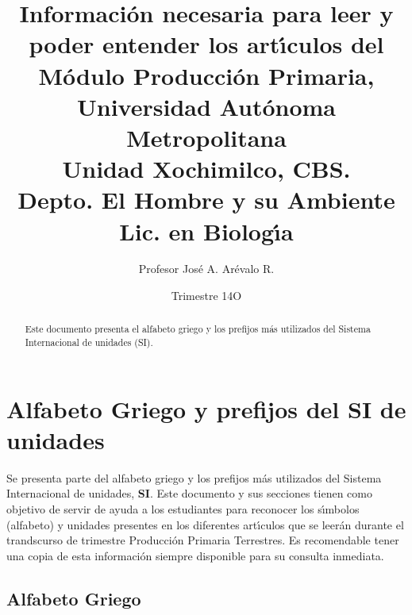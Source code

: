 \documentclass[letterpaper,spanish,12pt]{article}
\begin{document}
\title{Informaci\'{o}n necesaria para leer y poder entender los
  art\'{\i}culos del \\ 
M\'{o}dulo Producci\'{o}n Primaria, \\  
Universidad Aut\'{o}noma Metropolitana \\
Unidad Xochimilco, CBS. \\
Depto. El Hombre y su Ambiente \\
Lic. en Biolog\'{\i}a}

\author{Profesor Jos\'{e} A. Ar\'evalo R.}

\date{Trimestre 14O}

\maketitle

\begin{abstract}

Este documento presenta el alfabeto griego y los prefijos m\'{a}s
utilizados del Sistema Internacional de unidades (SI).
\end{abstract}


\section{Alfabeto Griego y prefijos del SI de unidades}

Se presenta parte del alfabeto griego y los prefijos m\'{a}s
utilizados del Sistema Internacional de unidades, \textbf{SI}. Este
documento y sus secciones tienen como objetivo de servir de ayuda a
los estudiantes para reconocer los s\'{\i}mbolos (alfabeto) y unidades
presentes en los diferentes art\'{\i}culos que se leer\'{a}n durante
el trandscurso de trimestre Producci\'{o}n Primaria Terrestres. Es
recomendable tener una copia de esta informaci\'{o}n siempre
disponible para su consulta inmediata.


\subsection*{Alfabeto Griego}
\end{document}
